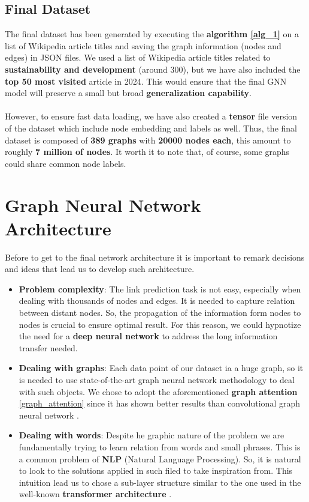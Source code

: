 \documentclass[11pt]{article}
\begin{document}
	\subsection{Final Dataset}
	The final dataset has been generated by executing the \textbf{algorithm \ref{alg_1}} on a list of Wikipedia article titles and saving the graph information (nodes and edges) in JSON files.
	We used a list of Wikipedia article titles related to \textbf{sustainability and development} (around $300$), but we have also included the \textbf{top 50 most visited} article in 2024.
	This would ensure that the final GNN model will preserve a small but broad \textbf{generalization capability}.\\\\
	However, to ensure fast data loading, we have also created a \textbf{tensor} file version of the dataset which include node embedding and labels as well.
	Thus, the final dataset is composed of \textbf{389 graphs} with \textbf{20000 nodes each}, this amount to roughly \textbf{7 million of nodes}. It worth it to note that, of course, some graphs could share common node labels.\\
	
	
	\section{Graph Neural Network Architecture}
	Before to get to the final network architecture it is important to remark decisions and ideas that lead us to develop such architecture. 
	\begin{itemize}
		\item{\textbf{Problem complexity}}: The link prediction task is not easy, especially when dealing with thousands of nodes and edges. It is needed to capture relation between distant nodes. So, the propagation of the information form nodes to nodes is crucial to ensure optimal result. For this reason, we could hypnotize the need for a \textbf{deep neural network} to address the long information transfer needed. 
		
		\item{\textbf{Dealing with graphs}}: Each data point of our dataset ia a huge graph, so it is needed to use state-of-the-art graph neural network methodology to deal with such objects. We chose to adopt the aforementioned \textbf{graph attention} \cite{veličković2018graphattentionnetworks} \ref{graph_attention} since it has shown better results than convolutional graph neural network \cite{kipf2017semisupervisedclassificationgraphconvolutional}. 
		
		\item{\textbf{Dealing with words}}: Despite he graphic nature of the problem we are fundamentally trying to learn relation from words and small phrases. This is a common problem of \textbf{NLP} (Natural Language Processing). So, it is natural to look to the solutions applied in such filed to take inspiration from. This intuition lead us to chose a sub-layer structure similar to the one used in the well-known \textbf{transformer architecture} \cite{vaswani2023attentionneed}.   
	\end{itemize}
	
\end{document}
